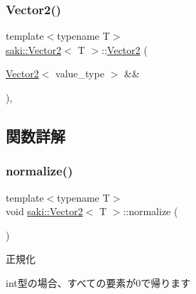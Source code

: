 \mbox{\label{classsaki_1_1_vector2_abaf03250171e9f2b18aa02aae22b6491}} 
\subsubsection{\texorpdfstring{Vector2()}{Vector2()}\hspace{0.1cm}{\footnotesize\ttfamily [5/5]}}
{\footnotesize\ttfamily template$<$typename T$>$ \\
\mbox{\hyperlink{classsaki_1_1_vector2}{saki\+::\+Vector2}}$<$ T $>$\+::\mbox{\hyperlink{classsaki_1_1_vector2}{Vector2}} (\begin{DoxyParamCaption}\item[{\mbox{\hyperlink{classsaki_1_1_vector2}{Vector2}}$<$ value\+\_\+type $>$ \&\&}]{ }\end{DoxyParamCaption})\hspace{0.3cm}{\ttfamily [default]}, {\ttfamily [noexcept]}}



\subsection{関数詳解}
\mbox{\label{classsaki_1_1_vector2_a8267f8608ffad9796813856c05076d8c}} 
\subsubsection{\texorpdfstring{normalize()}{normalize()}}
{\footnotesize\ttfamily template$<$typename T$>$ \\
void \mbox{\hyperlink{classsaki_1_1_vector2}{saki\+::\+Vector2}}$<$ T $>$\+::normalize (\begin{DoxyParamCaption}{ }\end{DoxyParamCaption})\hspace{0.3cm}{\ttfamily [inline]}}



正規化 

int型の場合、すべての要素が0で帰ります \mbox{\label{classsaki_1_1_vector2_aab202f42563239dfb59d27295d6c7462}} 
